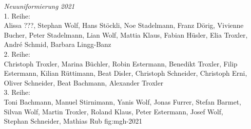 {\emph{Neuuniformierung 2021}\\
    1. Reihe:\\
    Alissa ???, Stephan Wolf, Hans Stöckli, Noe Stadelmann, Franz Dörig,
    Vivienne Bucher, Peter Stadelmann, Lian Wolf, Mattia Klaus, Fabian Hüsler,
    Elia Troxler, André Schmid, Barbara Lingg-Banz\\
    2. Reihe:\\
    Christoph Troxler, Marina Büchler, Robin Estermann, Benedikt Troxler, Filip
    Estermann, Kilian Rüttimann, Beat Disler, Christoph Schneider, Christoph
    Erni, Oliver Schneider, Beat Bachmann, Alexander Troxler\\
    3. Reihe:\\
    Toni Bachmann, Manuel Stirnimann, Yanis Wolf, Jonas Furrer, Stefan Barmet,
    Silvan Wolf, Martin Troxler, Roland Klaus, Peter Estermann, Josef Wolf,
    Stephan Schneider, Mathias Rub } {fig:mgh-2021}


